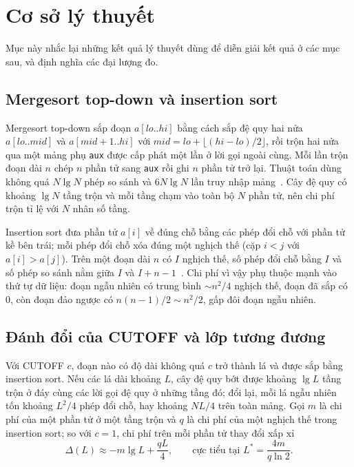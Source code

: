 \documentclass[12pt,a4paper]{article}
\begin{document}
\section{Cơ sở lý thuyết}\label{sec:2}
Mục này nhắc lại những kết quả lý thuyết dùng để diễn giải kết quả ở các mục sau, và định nghĩa các đại lượng đo.
\subsection{Mergesort top-down và insertion sort}\label{sec:2.1}\label{sec:2.2}
Mergesort top-down sắp đoạn $a[lo..hi]$ bằng cách sắp đệ quy hai nửa $a[lo..mid]$ và $a[mid{+}1..hi]$ với $mid = lo + \lfloor (hi-lo)/2 \rfloor$, rồi trộn hai nửa qua một mảng phụ \texttt{aux} được cấp phát một lần ở lời gọi ngoài cùng. Mỗi lần trộn đoạn dài $n$ chép $n$ phần tử sang \texttt{aux} rồi ghi $n$ phần tử trở lại. Thuật toán dùng không quá $N \lg N$ phép so sánh và $6 N \lg N$ lần truy nhập mảng~\citep{sedgewick2011}. Cây đệ quy có khoảng $\lg N$ tầng trộn và mỗi tầng chạm vào toàn bộ $N$ phần tử, nên chi phí trộn tỉ lệ với $N$ nhân số tầng.

Insertion sort đưa phần tử $a[i]$ về đúng chỗ bằng các phép đổi chỗ với phần tử kề bên trái; mỗi phép đổi chỗ xóa đúng một nghịch thế (cặp $i < j$ với $a[i] > a[j]$). Trên một đoạn dài $n$ có $I$ nghịch thế, số phép đổi chỗ bằng $I$ và số phép so sánh nằm giữa $I$ và $I + n - 1$~\citep{sedgewick2011,knuth1998}. Chi phí vì vậy phụ thuộc mạnh vào thứ tự dữ liệu: đoạn ngẫu nhiên có trung bình $\sim n^2/4$ nghịch thế, đoạn đã sắp có 0, còn đoạn đảo ngược có $n(n-1)/2 \sim n^2/2$, gấp đôi đoạn ngẫu nhiên.

\subsection{Đánh đổi của CUTOFF và lớp tương đương}\label{sec:2.3}\label{sec:2.4}

Với CUTOFF $c$, đoạn nào có độ dài không quá $c$ trở thành lá và được sắp bằng insertion sort. Nếu các lá dài khoảng $L$, cây đệ quy bớt được khoảng $\lg L$ tầng trộn ở đáy cùng các lời gọi đệ quy ở những tầng đó; đổi lại, mỗi lá ngẫu nhiên tốn khoảng $L^2/4$ phép đổi chỗ, hay khoảng $NL/4$ trên toàn mảng. Gọi $m$ là chi phí của một phần tử ở một tầng trộn và $q$ là chi phí của một nghịch thế trong insertion sort; so với $c = 1$, chi phí trên mỗi phần tử thay đổi xấp xỉ
\begin{equation}
  \Delta(L) \approx -m \lg L + \frac{qL}{4},
  \qquad \text{cực tiểu tại } L^* = \frac{4m}{q \ln 2}.
  \label{eq:tradeoff}
\end{equation}
\end{document}
